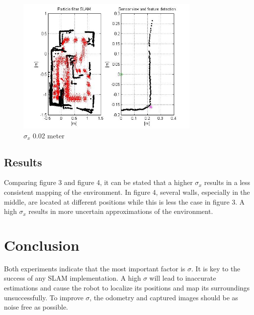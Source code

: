 \documentclass[12pt]{article}
\begin{document}
\begin{figure}[H]
	\centering
	\includegraphics[width=0.8\textwidth]{own_very_high_sigma.jpg}
	\caption{$\sigma_x$ 0.02 meter}
\end{figure}

\subsection{Results}
Comparing figure 3 and figure 4, it can be stated that a higher $\sigma_x$ results in a less consistent mapping of the environment. In figure 4, several walls, especially in the middle, are located at different positions while this is less the case in figure 3. A high $\sigma_x$ results in more uncertain approximations of the environment.

\section{Conclusion}
Both experiments indicate that the most important factor is $\sigma$. It is key to the success of any SLAM implementation. A high $\sigma$ will lead to inaccurate estimations and cause the robot to localize its positions and map its surroundings unsuccessfully. To improve $\sigma$, the odometry and captured images should be as noise free as possible.
\end{document}
